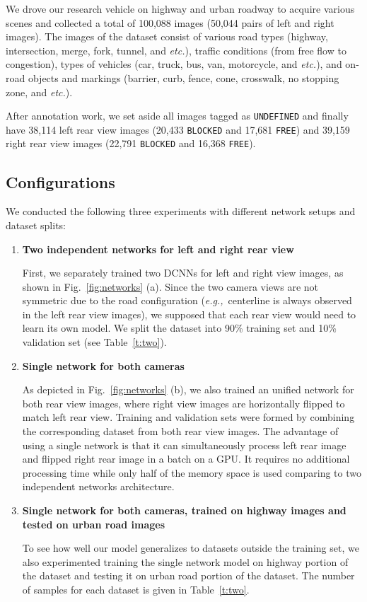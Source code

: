 \documentclass[letterpaper, 10pt, conference]{ieeeconf}
\newcommand{\eg}{\textit{e.g.,}~}
\newcommand{\etc}{\textit{etc.}}
\begin{document}
	We drove our research vehicle on highway and urban roadway to acquire various 
scenes and collected a total of 100,088 images (50,044 pairs of left and right images).
The images of the dataset consist of various 
road types (highway, intersection, merge, fork, tunnel, and \etc), 
traffic conditions (from free flow to congestion), 
types of vehicles (car, truck, bus, van, motorcycle, and \etc),
and on-road objects and markings (barrier, curb, fence, cone, crosswalk, no stopping zone, and \etc).

	After annotation work, we set aside all images tagged as {\tt UNDEFINED} and
finally have 38,114 left rear view images (20,433 {\tt BLOCKED} and
17,681 {\tt FREE}) and 39,159 right rear view images (22,791 {\tt BLOCKED} and
16,368 {\tt FREE}).

   \subsection{Configurations}%

    We conducted the following three experiments with different network setups and dataset splits:

    \begin{enumerate}[\bf E1.]

    \item{\bf Two independent networks for left and right rear view} 

    First, we separately trained two DCNNs for left and right view images, as
shown in Fig.~\ref{fig:networks} (a). Since the two camera views are not symmetric 
due to the road configuration (\eg centerline is always observed 
in the left rear view images), we supposed that each rear view would need to learn 
its own model. We split the dataset into 90\% training set and 10\% validation set 
(see Table~\ref{t:two}).

\item{\bf Single network for both cameras} 

	As depicted in Fig.~\ref{fig:networks} (b), we also trained an unified 
network for both rear view images, where right view images are horizontally flipped
to match left rear view. Training and validation sets were formed by combining the 
corresponding dataset from both rear view images. The advantage of using a single 
network is that it can simultaneously process left rear image and flipped right rear 
image in a batch on a GPU. It requires no additional processing time while only half 
of the memory space is used comparing to two independent networks architecture.

\item{\bf Single network for both cameras, trained on highway images and tested on urban road images} 

    To see how well our model generalizes to datasets outside the training set, 
we also experimented training the single network model on highway portion of the dataset 
and testing it on urban road portion of the dataset. The number of samples for each dataset 
is given in Table~\ref{t:two}.

\end{enumerate}
\end{document}
